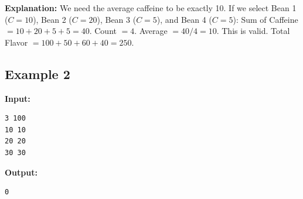 \documentclass[11pt, letterpaper]{article}
\begin{document}
\textbf{Explanation:}
We need the average caffeine to be exactly 10.
If we select Bean 1 ($C=10$), Bean 2 ($C=20$), Bean 3 ($C=5$), and Bean 4 ($C=5$):
Sum of Caffeine $= 10 + 20 + 5 + 5 = 40$.
Count $= 4$.
Average $= 40 / 4 = 10$. This is valid.
Total Flavor $= 100 + 50 + 60 + 40 = 250$.

\subsection*{Example 2}
\textbf{Input:}
\begin{verbatim}
3 100
10 10
20 20
30 30
\end{verbatim}

\textbf{Output:}
\begin{verbatim}
0
\end{verbatim}
\end{document}
